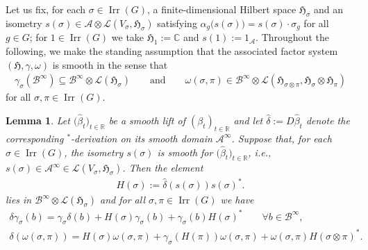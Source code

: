 \documentclass[pdftex]{sigma}
\numberwithin{equation}{section}
\newtheorem{Lemma}[Theorem]{Lemma}
\newcommand*{\R}{\mathbb R}		%
\newcommand*{\C}{\mathbb C}		%
\newcommand*{\tensor}{\otimes}		%
\newcommand*{\Star}{$^*$\nobreakdash}
\newcommand*{\hilb}{\mathfrak}		%
\newcommand*{\alg}{\mathcal}		%
\newcommand*{\hH}{\hilb{H}}			%
\newcommand*{\one}{1}				%
\newcommand*{\aA}{\alg{A}}			%
\newcommand*{\aB}{\alg{B}} 			%
\newcommand*{\End}{\mathcal{L}} %
\DeclareMathOperator{\Irrep}{Irr} 			%
\begin{document}
Let us fix, for each $\sigma \in \Irrep(G)$, a finite-dimensional Hilbert space $\hH_\sigma$ and an isometry $s(\sigma)\in \aA \tensor \End(V_\sigma,\hH_\sigma)$ satisfying $\alpha_g\big(s(\sigma)\big)=s(\sigma) \cdot \sigma_g$ for all $g \in G$; for $1 \in \Irrep(G)$ we take $\hH_1 := \C$ and $s(1) := \one_\aA$.
Throughout the following, we make the standing assumption that the associated factor system $(\hH, \gamma, \omega)$ is smooth in the sense that
\begin{gather*}
	\gamma_\sigma(\aB^\infty)
	\subseteq \aB^\infty \tensor \End(\hH_\sigma)
\qquad
	\text{and}
\qquad
	\omega(\sigma, \pi)
	\in \aB^\infty \tensor \End(\hH_{\sigma \tensor \pi},\hH_\sigma \tensor \hH_\pi)
\end{gather*}
for all $\sigma, \pi \in \Irrep(G)$.

\begin{Lemma}\label{lem:1_param_to_H}
	Let $\big(\hat\beta_t\big)_{t \in \R}$ be a smooth lift of $(\beta_t)_{t \in \R}$ and let $\hat \delta := D\hat\beta_t$ denote the corresponding \Star-derivation on its smooth domain $\aA^\infty$.
	Suppose that, for each $\sigma \in \Irrep(G)$, the isometry $s(\sigma)$ is smooth for $\big(\hat\beta_t\big)_{t \in \R}$, i.e., $s(\sigma) \in \aA^\infty \in \End(V_\sigma, \hH_\sigma)$.
	Then the element
	\begin{gather*}
		H(\sigma) := \hat \delta ( s(\sigma) ) s(\sigma)^* .
	\end{gather*}
	lies in $\aB^\infty \tensor \End(\hH_\sigma)$ and for all $\sigma, \pi \in \Irrep(G)$ we have
	\begin{gather}
		\label{eq:deriv_cond_1}
		\delta \gamma_\sigma(b)
		= \gamma_\sigma \delta(b) + H(\sigma) \gamma_\sigma(b) + \gamma_\sigma(b) H(\sigma)^*
		\qquad \forall b \in \aB^\infty,
		\\
		\label{eq:deriv_cond_2}		
		\delta ( \omega(\sigma,\pi) )
		= H(\sigma) \omega(\sigma,\pi) + \gamma_\sigma (H(\pi) ) \omega(\sigma,\pi) + \omega(\sigma,\pi) H(\sigma \tensor \pi)^*.
	\end{gather}
\end{Lemma}
\end{document}
